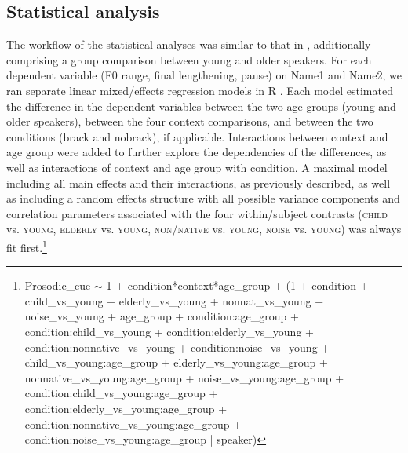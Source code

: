 \documentclass[output=paper]{langscibook}
\begin{document}
\subsection{Statistical analysis}\label{2.6}\largerpage
The workflow of the statistical analyses was similar to that in \citet{huttenlauchetal2021}, additionally comprising a group comparison between young and older speakers. For each dependent variable (F0 range, final lengthening, pause) on Name1 and Name2, we ran separate linear mixed\-/effects regression models in R \citep{r_development_core_team_r:_2018}. Each model estimated the difference in the dependent variables between the two age groups (young and older speakers), between the four context comparisons, and between the two conditions (brack and nobrack), if applicable. Interactions between context and age group were added to further explore the dependencies of the differences, as well as interactions of context and age group with condition. A maximal model including all main effects and their interactions, as previously described, as well as including a random effects structure with all possible variance components and correlation parameters associated with the four within\-/subject contrasts (\textsc{child} vs. \textsc{young}, \textsc{elderly} vs. \textsc{young}, \textsc{non\-/native} vs. \textsc{young}, \textsc{noise} vs. \textsc{young}) was always fit first.{\footnote{\ttfamily Prosodic\_cue $\sim$ 1 + condition*context*age\_group + \newline \hspace*{6.5mm}
(1 + condition + \newline \hspace*{8mm}child\_vs\_young + elderly\_vs\_young + nonnat\_vs\_young + noise\_vs\_young + \hspace*{8mm}age\_group + \newline \hspace*{8mm}condition:age\_group + \newline \hspace*{8mm}condition:child\_vs\_young + condition:elderly\_vs\_young + \newline \hspace*{8mm}condition:nonnative\_vs\_young + condition:noise\_vs\_young + \newline \hspace*{8mm}child\_vs\_young:age\_group + elderly\_vs\_young:age\_group + \newline \hspace*{8mm}nonnative\_vs\_young:age\_group + noise\_vs\_young:age\_group + \newline \hspace*{8mm}condition:child\_vs\_young:age\_group + condition:elderly\_vs\_young:age\_group + \newline \hspace*{8mm}condition:nonnative\_vs\_young:age\_group + \newline \hspace*{8mm}condition:noise\_vs\_young:age\_group | speaker)}} 
\end{document}
